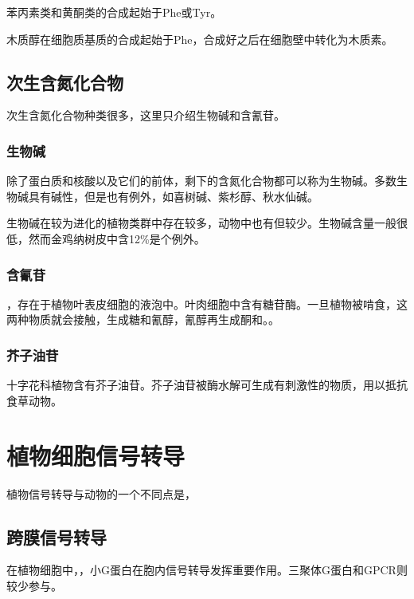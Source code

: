 苯丙素类和黄酮类的合成起始于Phe或Tyr。

木质醇在细胞质基质的合成起始于Phe，合成好之后在细胞壁中转化为木质素。

\subsection{次生含氮化合物}

次生含氮化合物种类很多，这里只介绍生物碱和含氰苷。

\subsubsection{生物碱}

除了蛋白质和核酸以及它们的前体，剩下的含氮化合物都可以称为生物碱。多数生物碱具有碱性，但是也有例外，如喜树碱、紫杉醇、秋水仙碱。

生物碱在较为进化的植物类群中存在较多，动物中也有但较少。生物碱含量一般很低，然而金鸡纳树皮中含12\%是个例外。

\subsubsection{含氰苷}

，存在于植物叶表皮细胞的液泡中。叶肉细胞中含有糖苷酶。一旦植物被啃食，这两种物质就会接触，生成糖和氰醇，氰醇再生成酮和。。

\subsubsection{芥子油苷}

十字花科植物含有芥子油苷。芥子油苷被酶水解可生成有刺激性的物质，用以抵抗食草动物。

\section{植物细胞信号转导}

植物信号转导与动物的一个不同点是，

\subsection{跨膜信号转导}

在植物细胞中，，小G蛋白在胞内信号转导发挥重要作用。三聚体G蛋白和GPCR则较少参与。

